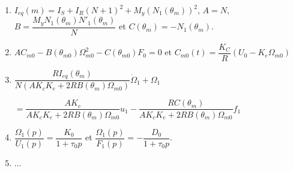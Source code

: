 \begin{enumerate}
\item $I_{eq}(m)=I_S+I_R\left(N+1\right)^2+M_y\left(N_1\left(\theta_m\right)\right)^2$, $A=N$, $B=\dfrac{M_y N_1\left( \theta_m\right)N'_1\left( \theta_m\right)}{N}$ et $C\left( \theta_m\right)=-N_1\left( \theta_m\right)$.
\item $AC_{m0}-B\left( \theta_{m0}\right) \Omega_{m0}^2-C\left( \theta_{m0}\right)F_0 = 0 $ et $C_{m0}(t)=\dfrac{K_C}{R}\left(U_0-K_e\Omega_{m0}\right)$
\item $\dfrac{RI_{eq}\left( \theta_m\right)}{N\left( AK_cK_e+2RB\left( \theta_m\right)\Omega_{m0}\right)} \dot{\Omega}_1+\Omega_1 $

 $= 
\dfrac{AK_c}{ AK_cK_e+2RB\left( \theta_m\right)\Omega_{m0}} u_1
- \dfrac{RC\left( \theta_m\right)}{ AK_cK_e+2RB\left( \theta_m\right)\Omega_{m0}} f_1$
\item $\dfrac{\Omega_1(p)}{U_1(p)}=\dfrac{K_0}{1+\tau_0 p}$ et $\dfrac{\Omega_1(p)}{F_1(p)}=-\dfrac{D_0}{1+\tau_0 p}$.
\item ...
\end{enumerate}
